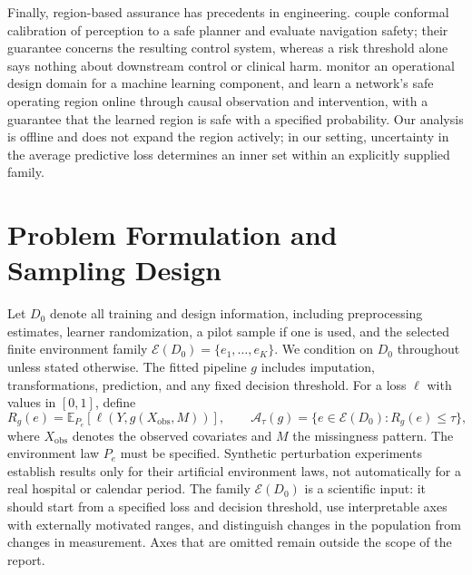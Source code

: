 \documentclass[twoside,11pt]{article}
\newcommand{\A}{\mathcal A}
\newcommand{\E}{\mathcal E}
\newcommand{\Ee}{\mathbb E}
\begin{document}
Finally, region-based assurance has precedents in engineering. \citet{dixit2025pwc} couple
conformal calibration of perception to a safe planner and evaluate navigation safety; their
guarantee concerns the resulting control system, whereas a risk threshold alone says nothing
about downstream control or clinical harm. \citet{torens2025odd} monitor an operational
design domain for a machine learning component, and \citet{hammar2026safe} learn a network's
safe operating region online through causal observation and intervention, with a guarantee
that the learned region is safe with a specified probability. Our analysis is offline and
does not expand the region actively; in our setting, uncertainty in the average predictive
loss determines an inner set within an explicitly supplied family.

\section{Problem Formulation and Sampling Design}
\label{sec:target}
Let $D_0$ denote all training and design information, including preprocessing estimates,
learner randomization, a pilot sample if one is used, and the selected finite environment
family $\E(D_0)=\{e_1,\ldots,e_K\}$. We condition on $D_0$ throughout unless stated otherwise.
The fitted pipeline $g$ includes imputation, transformations, prediction, and any fixed
decision threshold. For a loss $\ell$ with values in $[0,1]$, define
\begin{equation}
R_g(e)=\Ee_{P_e}[\ell(Y,g(X_{\mathrm{obs}},M))],\qquad
\A_\tau(g)=\{e\in\E(D_0):R_g(e)\leq\tau\},
\label{eq:target}
\end{equation}
where $X_{\mathrm{obs}}$ denotes the observed covariates and $M$ the missingness pattern. The
environment law $P_e$ must be specified. Synthetic perturbation experiments establish results
only for their artificial environment laws, not automatically for a real hospital or calendar
period. The family $\E(D_0)$ is a scientific input: it should start from a specified loss and
decision threshold, use interpretable axes with externally motivated ranges, and distinguish
changes in the population from changes in measurement. Axes that are omitted remain outside
the scope of the report.
\end{document}
